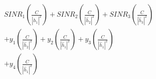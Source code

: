\documentclass[preview]{standalone}
\begin{document}
\begin{align*}
SINR_1 \left( \frac{C}{\left|{\hat{h}_1}\right|^2} \right) + SINR_2 \left( \frac{C}{\left|{\hat{h}_2}\right|^2} \right) + SINR_3 \left( \frac{C}{\left|{\hat{h}_3}\right|^2} \right) \\ + y_1 \left( \frac{C}{\left|{\hat{h}_2}\right|^2} \right) + y_2 \left( \frac{C}{\left|{\hat{h}_1}\right|^2} \right) + y_3 \left( \frac{C}{\left|{\hat{h}_1}\right|^2} \right) \\ + y_4 \left( \frac{C}{\left|{\hat{h}_1}\right|^2} \right)
\end{align*}
\end{document}
